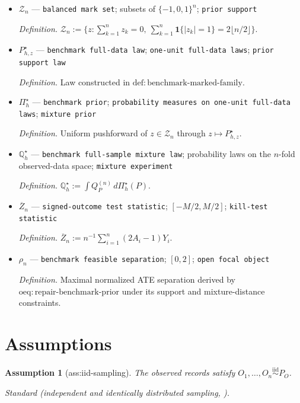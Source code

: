 \documentclass{article}
\newtheorem{assumption}{Assumption}
\begin{document}
\begin{itemize}
  \item \(\mathcal Z_n\) --- \texttt{balanced mark set}; subsets of \(\{-1,0,1\}^n\); \texttt{prior support}
  \par\smallskip\noindent\emph{Definition.} \(\mathcal Z_n:=\{z:\sum_{k=1}^nz_k=0,\ \sum_{k=1}^n\mathbf 1\{|z_k|=1\}=2\lfloor n/2\rfloor\}\).
  \item \(P_{h,z}^\star\) --- \texttt{benchmark full-\allowbreak{}data law}; \texttt{one-\allowbreak{}unit full-\allowbreak{}data laws}; \texttt{prior support law}
  \par\smallskip\noindent\emph{Definition.} Law constructed in \(\mathrm{def:benchmark\text{-}marked\text{-}family}\).
  \item \(\Pi_h^\star\) --- \texttt{benchmark prior}; \texttt{probability measures on one-\allowbreak{}unit full-\allowbreak{}data laws}; \texttt{mixture prior}
  \par\smallskip\noindent\emph{Definition.} Uniform pushforward of \(z\in\mathcal Z_n\) through \(z\mapsto P_{h,z}^\star\).
  \item \(\mathbb Q_h^\star\) --- \texttt{benchmark full-\allowbreak{}sample mixture law}; probability laws on the \(n\)-fold observed-data space; \texttt{mixture experiment}
  \par\smallskip\noindent\emph{Definition.} \(\mathbb Q_h^\star:=\int Q_P^{(n)}\,d\Pi_h^\star(P)\).
  \item \(\overline Z_n\) --- \texttt{signed-\allowbreak{}outcome test statistic}; \([-M/2,M/2]\); \texttt{kill-\allowbreak{}test statistic}
  \par\smallskip\noindent\emph{Definition.} \(\overline Z_n:=n^{-1}\sum_{i=1}^n(2A_i-1)Y_i\).
  \item \(\rho_n\) --- \texttt{benchmark feasible separation}; \([0,2]\); \texttt{open focal object}
  \par\smallskip\noindent\emph{Definition.} Maximal normalized ATE separation derived by \(\mathrm{oeq:repair\text{-}benchmark\text{-}prior}\) under its support and mixture-distance constraints.
\end{itemize}

\section{Assumptions}

\begin{assumption}[ass:iid-sampling]\label{ass:iid-sampling}
The observed records satisfy \(O_1,\ldots,O_n\stackrel{\mathrm{iid}}{\sim}P_O\).
\par\smallskip\noindent\emph{Standard} (independent and identically distributed sampling, \cite{ZengBalakrishnanHanKennedy2024}).
\end{assumption}
\end{document}
